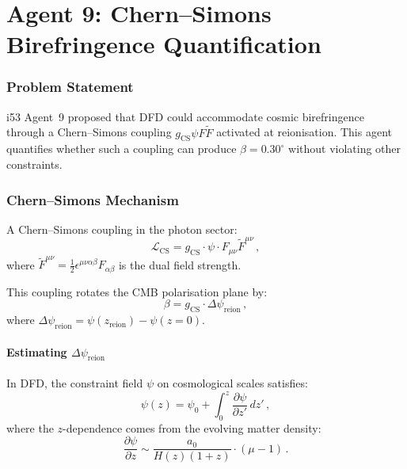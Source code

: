 \documentclass[11pt,a4paper]{article}
\begin{document}
\part{Agent 9: Chern--Simons Birefringence Quantification}
\label{part:cs-biref}

\section{Problem Statement}

i53 Agent~9 proposed that DFD could accommodate cosmic birefringence through a Chern--Simons coupling $g_{\mathrm{CS}}\psi F\tilde{F}$ activated at reionisation. This agent quantifies whether such a coupling can produce $\beta = 0.30^\circ$ without violating other constraints.

\section{Chern--Simons Mechanism}

A Chern--Simons coupling in the photon sector:
\begin{equation}
\mathcal{L}_{\mathrm{CS}} = g_{\mathrm{CS}} \cdot \psi \cdot F_{\mu\nu}\tilde{F}^{\mu\nu}\,,
\end{equation}
where $\tilde{F}^{\mu\nu} = \frac{1}{2}\epsilon^{\mu\nu\alpha\beta}F_{\alpha\beta}$ is the dual field strength.

This coupling rotates the CMB polarisation plane by:
\begin{equation}
\beta = g_{\mathrm{CS}} \cdot \Delta\psi_{\mathrm{reion}}\,,
\end{equation}
where $\Delta\psi_{\mathrm{reion}} = \psi(z_{\mathrm{reion}}) - \psi(z = 0)$.

\subsection{Estimating $\Delta\psi_{\mathrm{reion}}$}

In DFD, the constraint field $\psi$ on cosmological scales satisfies:
\begin{equation}
\psi(z) = \psi_0 + \int_0^z \frac{\partial\psi}{\partial z'}\,dz'\,,
\end{equation}
where the $z$-dependence comes from the evolving matter density:
\begin{equation}
\frac{\partial\psi}{\partial z} \sim \frac{a_0}{H(z)(1+z)} \cdot (\mu - 1)\,.
\end{equation}
\end{document}
